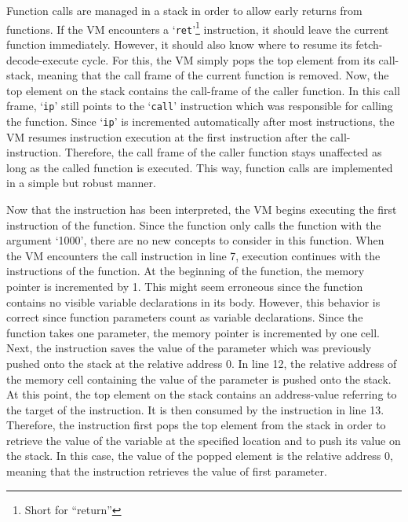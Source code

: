 Function calls are managed in a stack in order to allow early returns from functions.
If the VM encounters a `\texttt{ret}'\footnote{Short for \enquote{return}} instruction, it should leave the current function immediately.
However, it should also know where to resume its fetch-decode-execute cycle.
For this, the VM simply pops the top element from its call-stack, meaning that the call frame of the current function is removed.
Now, the top element on the stack contains the call-frame of the caller function.
In this call frame, `\texttt{ip}' still points to the `\texttt{call}' instruction which was responsible for calling the function.
Since `\texttt{ip}' is incremented automatically after most instructions, the VM resumes instruction execution at the first instruction after the call-instruction.
Therefore, the call frame of the caller function stays unaffected as long as the called function is executed.
This way, function calls are implemented in a simple but robust manner.


Now that the  instruction has been interpreted, the VM begins executing the first instruction of the  function.
Since the  function only calls the  function with the argument `1000', there are no new concepts to consider in this function.
When the VM encounters the call instruction in line 7, execution continues with the instructions of the  function.
At the beginning of the  function, the memory pointer is incremented by 1.
This might seem erroneous since the  function contains no visible variable declarations in its body.
However, this behavior is correct since function parameters count as variable declarations.
Since the function takes one parameter, the memory pointer is incremented by one cell.
Next, the  instruction saves the value of the parameter which was previously pushed onto the stack at the relative address 0.
In line 12, the relative address of the memory cell containing the value of the parameter is pushed onto the stack.
At this point, the top element on the stack contains an address-value referring to the target of the  instruction.
It is then consumed by the  instruction in line 13.
Therefore, the instruction first pops the top element from the stack in order to
retrieve the value of the variable at the specified location and to push its value on the stack.
In this case, the value of the popped element is the relative address 0, meaning that the instruction retrieves the value of first parameter.

